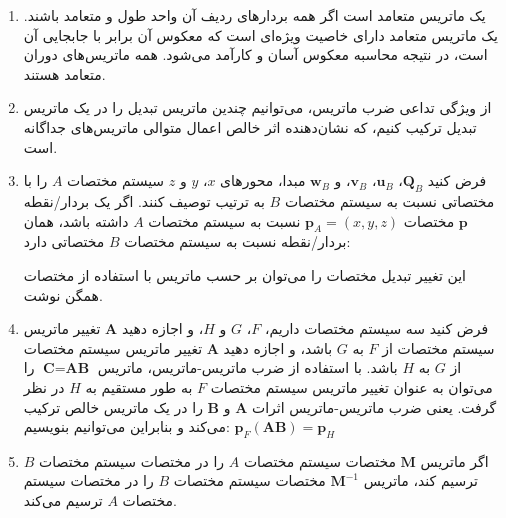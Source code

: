 {\begin{spacing}{1.5}
\begin{enumerate}[label=\textbf{\arabic*}.]
            \item {یک ماتریس متعامد است اگر همه بردارهای ردیف آن واحد طول و متعامد باشند.
            یک ماتریس متعامد دارای خاصیت ویژه‌ای است که معکوس آن برابر با جابجایی آن است،
            در نتیجه محاسبه معکوس آسان و کارآمد می‌شود. همه ماتریس‌های دوران متعامد هستند.}

            \item {از ویژگی تداعی ضرب ماتریس، می‌توانیم چندین ماتریس تبدیل را در یک ماتریس تبدیل ترکیب کنیم، که نشان‌دهنده اثر خالص اعمال متوالی ماتریس‌های جداگانه است.}

            \item {فرض کنید $\textbf{Q}_{B}$، $\textbf{u}_{B}$، $\textbf{v}_{B}$، و $\textbf{w}_{B}$ مبدا، محورهای $x$، $y$ و $z$ سیستم مختصات $A$ را با مختصاتی نسبت به سیستم مختصات $B$ به ترتیب توصیف کنند.
            اگر یک بردار/نقطه $\textbf{p}$ مختصات $\textbf{p}_{A}=(x,y,z)$ نسبت به سیستم مختصات $A$ داشته باشد، همان بردار/نقطه نسبت به سیستم مختصات $B$ مختصاتی دارد:
                \begin{flushleft}
                \end{flushleft}
                این تغییر تبدیل مختصات را می‌توان بر حسب ماتریس با استفاده از مختصات همگن نوشت.
            }

            \item {فرض کنید سه سیستم مختصات داریم، $F$، $G$ و $H$، و اجازه دهید $\textbf{A}$ تغییر ماتریس سیستم مختصات از $F$ به $G$ باشد، و اجازه دهید $\textbf{A}$ تغییر ماتریس سیستم مختصات از $G$ به $H$ باشد.
            با استفاده از ضرب ماتریس-ماتریس، ماتریس $\textbf{C}=\textbf{AB}$ را می‌توان به عنوان تغییر ماتریس سیستم مختصات $F$ به طور مستقیم به $H$ در نظر گرفت.
            یعنی ضرب ماتریس-ماتریس اثرات $\textbf{A}$ و $\textbf{B}$ را در یک ماتریس خالص ترکیب می‌کند و بنابراین می‌توانیم بنویسیم:
                $\textbf{p}_{F}(\textbf{AB})=\textbf{p}_{H}$}

            \item {اگر ماتریس $\textbf{M}$ مختصات سیستم مختصات $A$ را در مختصات سیستم مختصات $B$ ترسیم کند،
            ماتریس $\textbf{M}^{-1}$ مختصات سیستم مختصات $B$ را در مختصات سیستم مختصات $A$ ترسیم می‌کند.}


\end{enumerate}
\end{spacing}}
